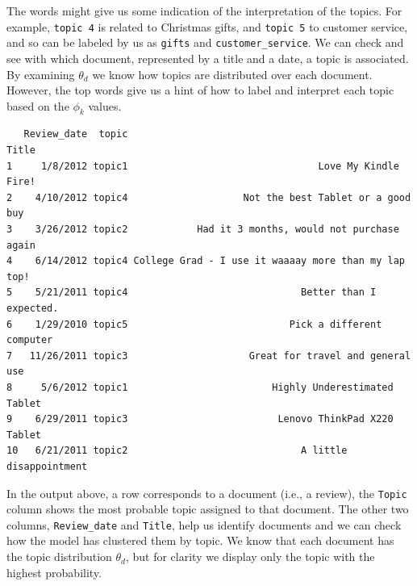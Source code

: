 The words might give us some indication of the interpretation of the
topics. For example, \texttt{topic\ 4} is related to Christmas gifts,
and \texttt{topic\ 5} to customer service, and so can be labeled by us as
\texttt{gifts} and \texttt{customer\_service}. We can check and see with
which document, represented by a title and a date, a topic is associated. By
examining \(\theta_d\) we know how topics are distributed over each
document. However, the top words give us a hint of how to label and
interpret each topic based on the \(\phi_k\) values.

\begin{Shaded}
\begin{Highlighting}[]
\OtherTok{\textless{}{-}} \SpecialCharTok{$}
\SpecialCharTok{$}\OtherTok{\textless{}{-}} 
\NormalTok{(dat[,}\NormalTok{(}\NormalTok{, }\NormalTok{, }\NormalTok{)], }\NormalTok{)}
\end{Highlighting}
\end{Shaded}

\begin{verbatim}
   Review_date  topic                                                Title
1     1/8/2012 topic1                                 Love My Kindle Fire!
2    4/10/2012 topic4                    Not the best Tablet or a good buy
3    3/26/2012 topic2            Had it 3 months, would not purchase again
4    6/14/2012 topic4 College Grad - I use it waaaay more than my lap top!
5    5/21/2011 topic4                              Better than I expected.
6    1/29/2010 topic5                            Pick a different computer
7   11/26/2011 topic3                     Great for travel and general use
8     5/6/2012 topic1                         Highly Underestimated Tablet
9    6/29/2011 topic3                          Lenovo ThinkPad X220 Tablet
10   6/21/2011 topic2                              A little disappointment
\end{verbatim}

In the output above, a row corresponds to a document (i.e., a review), the
\texttt{Topic} column shows the most probable topic assigned to that
document. The other two columns, \texttt{Review\_date} and
\texttt{Title}, help us identify documents and we can check how the model
has clustered them by topic. We know that each document has the topic
distribution \(\theta_d\), but for clarity we display only the
topic with the highest probability.

